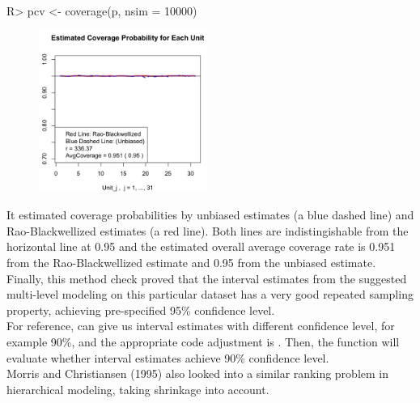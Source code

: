\documentclass[article]{jss}
\begin{document}
\begin{CodeChunk}
\begin{CodeInput}
R> pcv <- coverage(p, nsim = 10000)
\end{CodeInput}
\end{CodeChunk}
\begin{figure}[h]
\begin{center}
\includegraphics[width = 5.5cm]{hospital2.png}
\end{center}
\end{figure}

It estimated coverage probabilities by unbiased estimates (a blue dashed line) and Rao-Blackwellized estimates (a red line). Both lines are indistingishable from the horizontal line at 0.95 and the estimated overall average coverage rate is 0.951 from the Rao-Blackwellized estimate and 0.95 from the unbiased estimate. Finally, this method check proved that the interval estimates from the suggested multi-level modeling on this particular dataset has a very good repeated sampling property, achieving pre-specified 95\% confidence level.
\\

For reference,  can give us interval estimates with different confidence level, for example 90\%,  and the appropriate code adjustment is .  Then, the function  will evaluate whether interval estimates achieve 90\% confidence level.
\\

Morris and Christiansen (1995) also looked into a similar ranking problem in hierarchical modeling, taking shrinkage into account.
\\
\end{document}
